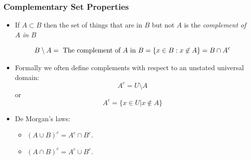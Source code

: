 \documentclass[aspectratio=169]{beamer}
\numberwithin{equation}{section}
\begin{document}












\begin{frame}
\frametitle{Complementary Set Properties}

\begin{itemize}
\item If $A\subset B$ then the set of things that are in $B$ but not $A$ is the \textit{complement of $A$ in $B$} \pause

$$B\setminus A= \hbox{ The complement of $A$ in $B$} = \{x\in B: x\not\in A\}= B\cap A^c$$ \pause

\item Formally we often define complements with respect to an unstated universal domain:
$$A^c=U\setminus A$$
or 
$$A^c=\{x\in U|x\notin A\}$$
\item De Morgan's laws:
\begin{itemize}
\item $(A\cup B)^c=A^c\cap B^c$.
\item $(A\cap B)^c=A^c\cup B^c$.
\end{itemize}

\end{itemize}
\end{frame}
\end{document}
